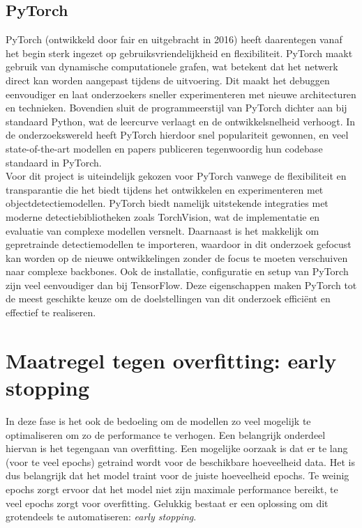 \subsection{PyTorch}

PyTorch (ontwikkeld door \gls{fair} en uitgebracht in 2016) heeft daarentegen vanaf het begin sterk ingezet op gebruiksvriendelijkheid en flexibiliteit. PyTorch maakt gebruik van dynamische computationele grafen, wat betekent dat het netwerk direct kan worden aangepast tijdens de uitvoering. Dit maakt het debuggen eenvoudiger en laat onderzoekers sneller experimenteren met nieuwe architecturen en technieken. Bovendien sluit de programmeerstijl van PyTorch dichter aan bij standaard Python, wat de leercurve verlaagt en de ontwikkelsnelheid verhoogt. In de onderzoekswereld heeft PyTorch hierdoor snel populariteit gewonnen, en veel state-of-the-art modellen en papers publiceren tegenwoordig hun codebase standaard in PyTorch. \autocite{Imambi_2021} \\

Voor dit project is uiteindelijk gekozen voor PyTorch vanwege de flexibiliteit en transparantie die het biedt tijdens het ontwikkelen en experimenteren met objectdetectiemodellen. PyTorch biedt namelijk uitstekende integraties met moderne detectiebibliotheken zoals TorchVision, wat de implementatie en evaluatie van complexe modellen versnelt. Daarnaast is het makkelijk om gepretrainde detectiemodellen te importeren, waardoor in dit onderzoek gefocust kan worden op de nieuwe ontwikkelingen zonder de focus te moeten verschuiven naar complexe backbones. Ook de installatie, configuratie en setup van PyTorch zijn veel eenvoudiger dan bij TensorFlow. Deze eigenschappen maken PyTorch tot de meest geschikte keuze om de doelstellingen van dit onderzoek efficiënt en effectief te realiseren.

\section{Maatregel tegen overfitting: early stopping}

In deze fase is het ook de bedoeling om de modellen zo veel mogelijk te optimaliseren om zo de performance te verhogen. Een belangrijk onderdeel hiervan is het tegengaan van \gls{overfitting}. Een mogelijke oorzaak is dat er te lang (voor te veel epochs) getraind wordt voor de beschikbare hoeveelheid data. Het is dus belangrijk dat het model traint voor de juiste hoeveelheid epochs. Te weinig epochs zorgt ervoor dat het model niet zijn maximale performance bereikt, te veel epochs zorgt voor \gls{overfitting}. Gelukkig bestaat er een oplossing om dit grotendeels te automatiseren: \emph{early stopping}. \autocite{Ying_2019} \\

